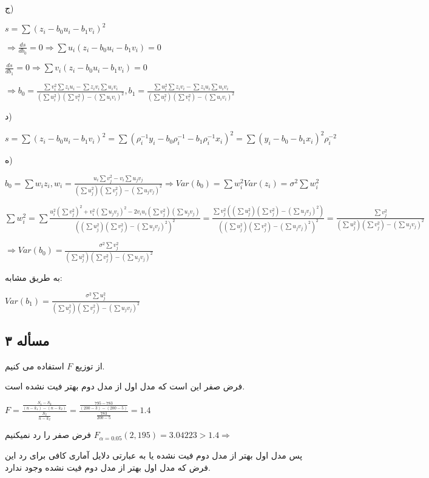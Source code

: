 \documentclass[12pt]{article}
\begin{document}
ج)
\begin{flushleft}
$s=\sum(z_i-b_0u_i-b_1v_i)^2$

$\Rightarrow \frac{ds}{db_0}=0\Rightarrow \sum u_i(z_i-b_0u_i-b_1v_i)=0$

$ \frac{ds}{db_1}=0\Rightarrow \sum v_i(z_i-b_0u_i-b_1v_i)=0$

$\Rightarrow b_0=\frac{\sum{v_i^2}\sum{z_iu_i}-\sum{z_iv_i}\sum{u_iv_i}}{(\sum{u_i^2})(\sum{v_i^2})-(\sum{u_iv_i})^2},b_1=\frac{\sum u_i^2\sum z_iv_i-\sum z_iu_i \sum u_iv_i}{(\sum{u_i^2})(\sum{v_i^2})-(\sum{u_iv_i})^2}$
\end{flushleft}

د)
\begin{flushleft}
$s=\sum (z_i-b_0u_i-b_1v_i)^2=\sum (\rho_i^{-1}y_i-b_0\rho_i^{-1}-b_1\rho_i^{-1}x_i)^2=\sum(y_i-b_0-b_1x_i)^2\rho_i^{-2}$
\end{flushleft}

ه)
\begin{flushleft}
$b_0=\sum{w_iz_i},w_i=\frac{u_i\sum v^2_j-v_i\sum u_j v_j}{(\sum{u_j^2})(\sum{v_j^2})-(\sum{u_jv_j})^2}\Rightarrow Var(b_0)=\sum{w_i^2Var(z_i)}=\sigma^2\sum w^2_i$

$\sum w_i^2=\sum \frac{u_i^2(\sum v_j^2)^2+v_i^2(\sum u_j v_j)^2-2v_iu_i(\sum v_j^2)(\sum u_j v_j)}{((\sum{u_j^2})(\sum{v_j^2})-(\sum{u_jv_j})^2)^2}=\frac{\sum v_j^2((\sum{u_j^2})(\sum{v_j^2})-(\sum{u_jv_j})^2)}{((\sum{u_j^2})(\sum{v_j^2})-(\sum{u_jv_j})^2)^2}=\frac{\sum v_j^2}{(\sum{u_j^2})(\sum{v_j^2})-(\sum{u_jv_j})^2}$

$\Rightarrow Var(b_0)=\frac{\sigma^2 \sum v_j^2}{(\sum{u_j^2})(\sum{v_j^2})-(\sum{u_jv_j})^2}$
\end{flushleft}

به طریق مشابه:
\begin{flushleft}
$Var(b_1)=\frac{\sigma^2\sum u_j^2}{(\sum{u_j^2})(\sum{v_j^2})-(\sum{u_jv_j})^2}$
\end{flushleft}
\subsection*{مسأله ۳}
از توزیع $F$ استفاده می کنیم.

فرض صفر این است که مدل اول از مدل دوم بهتر فیت نشده است.
\begin{flushleft}
$F=\frac{\frac{S_1-S_2}{(n-k_1)-(n-k_2)}}{\frac{S_2}{n-k_2}}=\frac{\frac{795-783}{(200-3)-(200-5)}}{\frac{783}{200-5}} = 1.4$

فرض صفر را رد نمیکنیم $F_{\alpha=0.05}(2,195)=3.04223>1.4\Rightarrow $ 
\end{flushleft}
پس مدل اول بهتر از مدل دوم فیت نشده یا به عبارتی دلایل آماری کافی برای رد این فرض که مدل اول بهتر از مدل دوم فیت نشده وجود ندارد.
\end{document}
